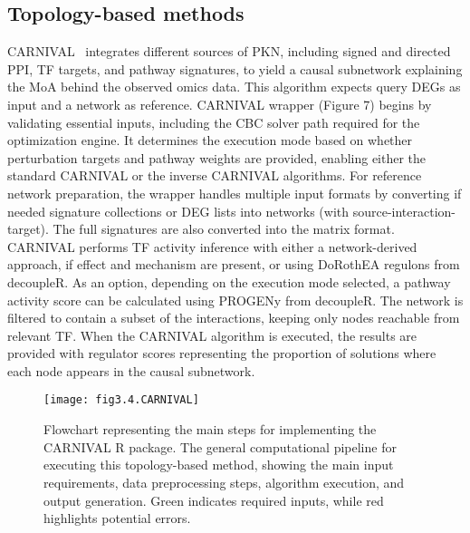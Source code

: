 \subsection{Topology-based methods} %
\label{sub:topology_based_methods}

\gls{CARNIVAL}~\cite{RN41} integrates different sources of \gls{PKN}, including signed and directed \gls{PPI}, \gls{TF} targets, and pathway signatures, to yield a causal subnetwork explaining the MoA behind the observed omics data. This algorithm expects query \gls{DEGs} as input and a network as reference. \gls{CARNIVAL} wrapper (Figure 7) begins by validating essential inputs, including the CBC solver path required for the optimization engine. 
It determines the execution mode based on whether perturbation targets and pathway weights are provided, enabling either the standard CARNIVAL or the inverse \gls{CARNIVAL} algorithms. 
For reference network preparation, the wrapper handles multiple input formats by converting if needed signature collections or DEG lists into networks (with source-interaction-target). The full signatures are also converted into the matrix format. \gls{CARNIVAL} performs \gls{TF} activity inference with either a network-derived approach, if effect and mechanism are present, or using DoRothEA regulons from decoupleR. 
As an option, depending on the execution mode selected, a pathway activity score can be calculated using PROGENy from decoupleR. 
The network is filtered to contain a subset of the interactions, keeping only nodes reachable from relevant \gls{TF}. When the \gls{CARNIVAL} algorithm is executed, the results are provided with regulator scores representing the proportion of solutions where each node appears in the causal subnetwork.


\begin{figure}[htbp]
    \centering
    \texttt{[image: fig3.4.CARNIVAL]}
    \caption{Flowchart representing the main steps for implementing the CARNIVAL R package. The general computational pipeline for executing this topology-based method, showing the main input requirements, data preprocessing steps, algorithm execution, and output generation. Green indicates required inputs, while red highlights potential errors.}
    \label{fig:fig3.4.CARNIVAL}
\end{figure}

